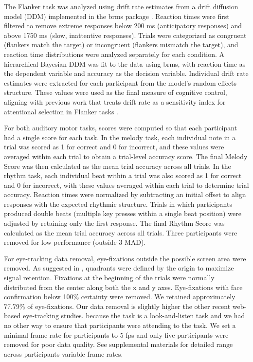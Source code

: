 The Flanker task was analyzed using drift rate estimates from a drift diffusion model (DDM) implemented in the brms package \parencite{burkner2017brms}. Reaction times were first filtered to remove extreme responses below 200 ms (anticipatory responses) and above 1750 ms (slow, inattentive responses). Trials were categorized as congruent (flankers match the target) or incongruent (flankers mismatch the target), and reaction time distributions were analyzed separately for each condition. A hierarchical Bayesian DDM was fit to the data using brms, with reaction time as the dependent variable and accuracy as the decision variable. Individual drift rate estimates were extracted for each participant from the model’s random effects structure. These values were used as the final measure of cognitive control, aligning with previous work that treats drift rate as a sensitivity index for attentional selection in Flanker tasks \parencite{poole2024putting}. 

For both auditory motor tasks, scores were computed so that each participant had a single score for each task. In the melody task, each individual note in a trial was scored as 1 for correct and 0 for incorrect, and these values were averaged within each trial to obtain a trial-level accuracy score. The final Melody Score was then calculated as the mean trial accuracy across all trials.  In the rhythm task, each individual beat within a trial was also scored as 1 for correct and 0 for incorrect, with these values averaged within each trial to determine trial accuracy. Reaction times were normalized by subtracting an initial offset to align responses with the expected rhythmic structure. Trials in which participants produced double beats (multiple key presses within a single beat position) were adjusted by retaining only the first response. The final Rhythm Score was calculated as the mean trial accuracy across all trials. Three participants were removed for low performance (outside 3 MAD).

For eye-tracking data removal, eye-fixations outside the possible screen area were removed. As suggested in \textcite{AOW}, quadrants were defined by the origin to maximize signal retention. Fixations at the beginning of the trials were normally distributed from the center along both the x and y axes. Eye-fixations with face confirmation below 100\% certainty were removed. We retained approximately 77.79\% of eye-fixations. Our data removal is slightly higher the other recent web-based eye-tracking studies. because the task is a look-and-listen task and we had no other way to ensure that participants were attending to the task. We set a minimal frame rate for participants to 5 fps \parencite{Vos_2022} and only five participants were removed for poor data quality. See supplemental materials for detailed range across participants variable frame rates.

